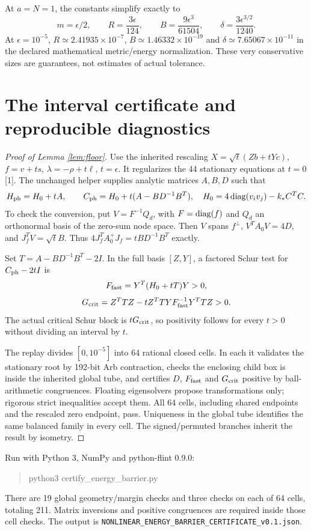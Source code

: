 \documentclass[11pt,a4paper]{article}
\begin{document}
At $a=N=1$, the constants simplify exactly to
\[
m=\epsilon/2,\qquad R=\frac{3\epsilon}{124},\qquad
B=\frac{9\epsilon^3}{61504},\qquad
\delta=\frac{3\epsilon^{3/2}}{1240}.
\]
At $\epsilon=10^{-5}$, $R\simeq2.41935\times10^{-7}$, $B\simeq1.46332\times10^{-19}$ and $\delta\simeq7.65067\times10^{-11}$ in the declared mathematical metric/energy normalization. These very conservative sizes are guarantees, not estimates of actual tolerance.
\newpage
\section{The interval certificate and reproducible diagnostics}
\begin{proof}[Proof of Lemma \ref{lem:floor}]
Use the inherited rescaling $X=\sqrt t(Zb+tYc)$, $f=v+ts$, $\lambda=-\rho+t\ell$, $t=\epsilon$. It regularizes the 44 stationary equations at $t=0$ [1]. The unchanged helper supplies analytic matrices $A,B,D$ such that
\[
H_{\rm ph}=H_0+tA,\qquad
C_{\rm ph}=H_0+t(A-BD^{-1}B^T),
\quad H_0=4\operatorname{diag}(v_iv_j)-k_*C^TC.
\]
To check the conversion, put $V=F^{-1}Q_d$, with $F=\operatorname{diag}(f)$ and $Q_d$ an orthonormal basis of the zero-sum node space. Then $V$ spans $f^\perp$, $V^TA_0V=4D$, and $J_f^TV=\sqrt t B$. Thus $4J_f^TA_0^+J_f=tBD^{-1}B^T$ exactly.

Set $T=A-BD^{-1}B^T-2I$. In the full basis $[Z,Y]$, a factored Schur test for $C_{\rm ph}-2tI$ is
\[
F_{\rm fast}=Y^T(H_0+tT)Y>0,
\]
\[
G_{\rm crit}=Z^TTZ-tZ^TTYF_{\rm fast}^{-1}Y^TTZ>0.
\]
The actual critical Schur block is $tG_{\rm crit}$, so positivity follows for every $t>0$ without dividing an interval by $t$.

The replay divides $[0,10^{-5}]$ into 64 rational closed cells. In each it validates the stationary root by 192-bit Arb contraction, checks the enclosing child box is inside the inherited global tube, and certifies $D$, $F_{\rm fast}$ and $G_{\rm crit}$ positive by ball-arithmetic congruences. Floating eigensolvers propose transformations only; rigorous strict inequalities accept them. All 64 cells, including shared endpoints and the rescaled zero endpoint, pass. Uniqueness in the global tube identifies the same balanced family in every cell. The signed/permuted branches inherit the result by isometry.
\end{proof}
Run with Python 3, NumPy and python-flint 0.9.0:
\begin{quote}\ttfamily python3 certify\_energy\_barrier.py\end{quote}
There are 19 global geometry/margin checks and three checks on each of 64 cells, totaling 211. Matrix inversions and positive congruences are required inside those cell checks. The output is \texttt{NONLINEAR\_ENERGY\_BARRIER\_CERTIFICATE\_v0.1.json}.
\end{document}
